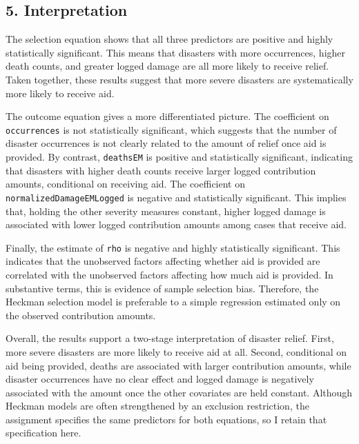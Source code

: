 \documentclass[12pt,letterpaper]{article}
\begin{document}
	\subsection*{5. Interpretation}
	
	The selection equation shows that all three predictors are positive and highly statistically significant. This means that disasters with more occurrences, higher death counts, and greater logged damage are all more likely to receive relief. Taken together, these results suggest that more severe disasters are systematically more likely to receive aid.
	
	The outcome equation gives a more differentiated picture. The coefficient on \texttt{occurrences} is not statistically significant, which suggests that the number of disaster occurrences is not clearly related to the amount of relief once aid is provided. By contrast, \texttt{deathsEM} is positive and statistically significant, indicating that disasters with higher death counts receive larger logged contribution amounts, conditional on receiving aid. The coefficient on \texttt{normalizedDamageEMLogged} is negative and statistically significant. This implies that, holding the other severity measures constant, higher logged damage is associated with lower logged contribution amounts among cases that receive aid.
	
	Finally, the estimate of \texttt{rho} is negative and highly statistically significant. This indicates that the unobserved factors affecting whether aid is provided are correlated with the unobserved factors affecting how much aid is provided. In substantive terms, this is evidence of sample selection bias. Therefore, the Heckman selection model is preferable to a simple regression estimated only on the observed contribution amounts.
	
	Overall, the results support a two-stage interpretation of disaster relief. First, more severe disasters are more likely to receive aid at all. Second, conditional on aid being provided, deaths are associated with larger contribution amounts, while disaster occurrences have no clear effect and logged damage is negatively associated with the amount once the other covariates are held constant. Although Heckman models are often strengthened by an exclusion restriction, the assignment specifies the same predictors for both equations, so I retain that specification here.
	
\end{document}
